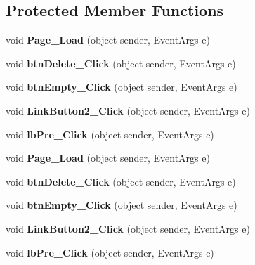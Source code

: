 \subsection*{Protected Member Functions}
\begin{DoxyCompactItemize}
\item 
\hypertarget{classusertrash_a520e5c5930a9f2ff8a545a8ab3385de6}{void {\bfseries Page\-\_\-\-Load} (object sender, Event\-Args e)}\label{classusertrash_a520e5c5930a9f2ff8a545a8ab3385de6}

\item 
\hypertarget{classusertrash_afe98b14dd6110f1ae1a31a1b618180a4}{void {\bfseries btn\-Delete\-\_\-\-Click} (object sender, Event\-Args e)}\label{classusertrash_afe98b14dd6110f1ae1a31a1b618180a4}

\item 
\hypertarget{classusertrash_a823a79f7524fe6363e849008626d8346}{void {\bfseries btn\-Empty\-\_\-\-Click} (object sender, Event\-Args e)}\label{classusertrash_a823a79f7524fe6363e849008626d8346}

\item 
\hypertarget{classusertrash_a4e23a34da5cb3797584f76e706b751e7}{void {\bfseries Link\-Button2\-\_\-\-Click} (object sender, Event\-Args e)}\label{classusertrash_a4e23a34da5cb3797584f76e706b751e7}

\item 
\hypertarget{classusertrash_a61a2b600be22ef5600a983c732f9a64b}{void {\bfseries lb\-Pre\-\_\-\-Click} (object sender, Event\-Args e)}\label{classusertrash_a61a2b600be22ef5600a983c732f9a64b}

\item 
\hypertarget{classusertrash_a520e5c5930a9f2ff8a545a8ab3385de6}{void {\bfseries Page\-\_\-\-Load} (object sender, Event\-Args e)}\label{classusertrash_a520e5c5930a9f2ff8a545a8ab3385de6}

\item 
\hypertarget{classusertrash_afe98b14dd6110f1ae1a31a1b618180a4}{void {\bfseries btn\-Delete\-\_\-\-Click} (object sender, Event\-Args e)}\label{classusertrash_afe98b14dd6110f1ae1a31a1b618180a4}

\item 
\hypertarget{classusertrash_a823a79f7524fe6363e849008626d8346}{void {\bfseries btn\-Empty\-\_\-\-Click} (object sender, Event\-Args e)}\label{classusertrash_a823a79f7524fe6363e849008626d8346}

\item 
\hypertarget{classusertrash_a4e23a34da5cb3797584f76e706b751e7}{void {\bfseries Link\-Button2\-\_\-\-Click} (object sender, Event\-Args e)}\label{classusertrash_a4e23a34da5cb3797584f76e706b751e7}

\item 
\hypertarget{classusertrash_a61a2b600be22ef5600a983c732f9a64b}{void {\bfseries lb\-Pre\-\_\-\-Click} (object sender, Event\-Args e)}\label{classusertrash_a61a2b600be22ef5600a983c732f9a64b}

\end{DoxyCompactItemize}


